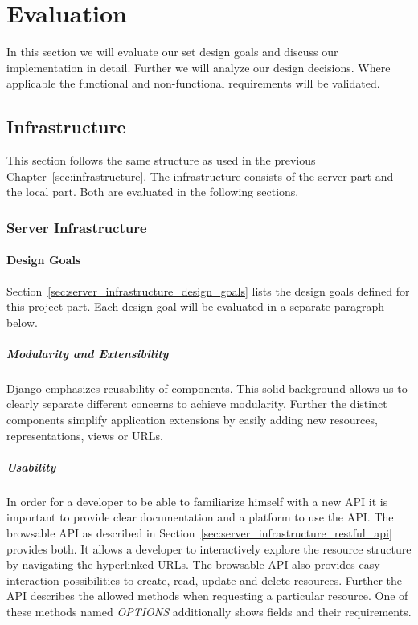 
\chapter{Evaluation}
\label{sec:evaluation}

In this section we will evaluate our set design goals and discuss our implementation in detail.
Further we will analyze our design decisions.
Where applicable the functional and non-functional requirements will be validated.

\section{Infrastructure}

This section follows the same structure as used in the previous Chapter~\ref{sec:infrastructure}.
The infrastructure consists of the server part and the local part.
Both are evaluated in the following sections.

\subsection{Server Infrastructure}

\subsubsection{Design Goals}

Section~\ref{sec:server_infrastructure_design_goals} lists the design goals defined for this project part.
Each design goal will be evaluated in a separate paragraph below.

\paragraph{Modularity and Extensibility} Django emphasizes reusability of components.
This solid background allows us to clearly separate different concerns to achieve modularity.
Further the distinct components simplify application extensions by easily adding new resources, representations, views or URLs.


\paragraph{Usability} In order for a developer to be able to familiarize himself with a new API it is important to provide clear documentation and a platform to use the API.
The browsable API as described in Section~\ref{sec:server_infrastructure_restful_api} provides both.
It allows a developer to interactively explore the resource structure by navigating the hyperlinked URLs.
The browsable API also provides easy interaction possibilities to create, read, update and delete resources.
Further the API describes the allowed methods when requesting a particular resource.
One of these methods named \emph{OPTIONS} additionally shows fields and their requirements.

